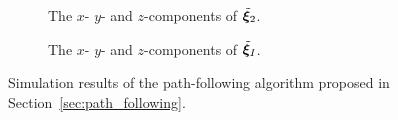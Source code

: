 \begin{figure}[htb]
\begin{minipage}{0.48\textwidth}
        \vspace*{-3.5mm}

        \begin{subfigure}{\textwidth}
            
            \caption{The $x$- $y$- and $z$-components of $\tilde{\bm{\xi}}_2$.}
            \label{fig:path_velocity}
        \end{subfigure}

        \vspace*{-3.5mm}

        \begin{subfigure}{\textwidth}
            
            \caption{The $x$- $y$- and $z$-components of $\tilde{\bm{\xi}}_I$.}
            \label{fig:path_integral}
        \end{subfigure}
        \vspace*{-2mm}
    \end{minipage}
    \caption{Simulation results of the path-following algorithm proposed in Section~\ref{sec:path_following}.
    }
    \label{fig:path_following}
\end{figure}
